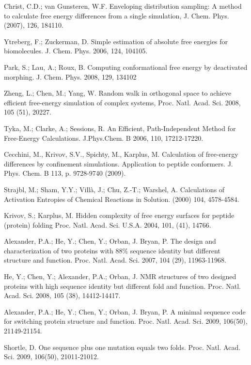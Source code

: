 \documentclass[12pt]{article}
\begin{document}
\begin{thebibliography}{99}
Christ, C.D.; van Gunsteren, W.F. Enveloping distribution sampling: A method to calculate free energy differences from a single simulation,
J. Chem. Phys. (2007), 126, 184110.

Ytreberg, F.; Zuckerman, D. Simple estimation of absolute free energies for biomolecules. J. Chem. Phys. 2006, 124, 104105.

Park, S.; Lau, A.; Roux, B. Computing conformational free energy by deactivated morphing. J. Chem. Phys. 2008, 129, 134102

Zheng, L.; Chen, M.; Yang, W. Random walk in orthogonal space to achieve efficient free-energy simulation of complex systems, Proc. Natl. Acad. Sci. 2008, 105 (51), 20227.

Tyka, M.; Clarke, A.; Sessions, R. An Efficient, Path-Independent Method for Free-Energy Calculations. J.Phys.Chem. B 2006, 110, 17212-17220.

Cecchini, M., Krivov, S.V., Spichty, M., Karplus, M. Calculation of free-energy differences by confinement simulations. Application to peptide conformers. 
J. Phys. Chem. B 113, p. 9728-9740 (2009).

Strajbl, M.; Sham, Y.Y.; Villà, J.; Chu, Z.-T.; Warshel, A. Calculations of Activation Entropies of Chemical Reactions 
in Solution. (2000) 104, 4578-4584.  

Krivov, S.; Karplus, M. Hidden complexity of free energy surfaces for peptide (protein) folding Proc. Natl. Acad. Sci. U.S.A. 2004, 101, (41), 14766.

Alexander, P.A.; He, Y.; Chen, Y.; Orban, J. Bryan, P. The design and characterization of two proteins with $88 \%$ sequence identity but different 
structure and function. Proc. Natl. Acad. Sci. 2007, 104 (29), 11963-11968.

He, Y.; Chen, Y.; Alexander, P.A.; Orban, J. NMR structures of two designed proteins with high sequence identity but different fold and function. Proc. Natl. Acad. Sci. 2008, 105 (38), 14412-14417.

Alexander, P.A.; He, Y.; Chen, Y.; Orban, J. Bryan, P. A minimal sequence code for switching protein structure and function. Proc. Natl. Acad. Sci. 2009, 106(50), 21149-21154.

Shortle, D. One sequence plus one mutation equals two folds. Proc. Natl. Acad. Sci. 2009, 106(50), 21011-21012. 


\end{thebibliography}
\end{document}
